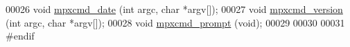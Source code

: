 \begin{DoxyCode}
00026 \textcolor{keywordtype}{void}    \hyperlink{mpx__cmd_8c_a8959742dda38733f33da60a56cb07373}{mpxcmd_date}             (\textcolor{keywordtype}{int} argc, \textcolor{keywordtype}{char} *argv[]);
00027 \textcolor{keywordtype}{void}    \hyperlink{mpx__cmd_8c_a70a1ce3926ea7c41321ab42b4161df0d}{mpxcmd_version}  (\textcolor{keywordtype}{int} argc, \textcolor{keywordtype}{char} *argv[]);
00028 \textcolor{keywordtype}{void}    \hyperlink{mpx__cmd_8c_a0a04805761cf7c183609e1383a4c4975}{mpxcmd_prompt}   (\textcolor{keywordtype}{void});
00029 
00030 
00031 \textcolor{preprocessor}{#endif}
\end{DoxyCode}
